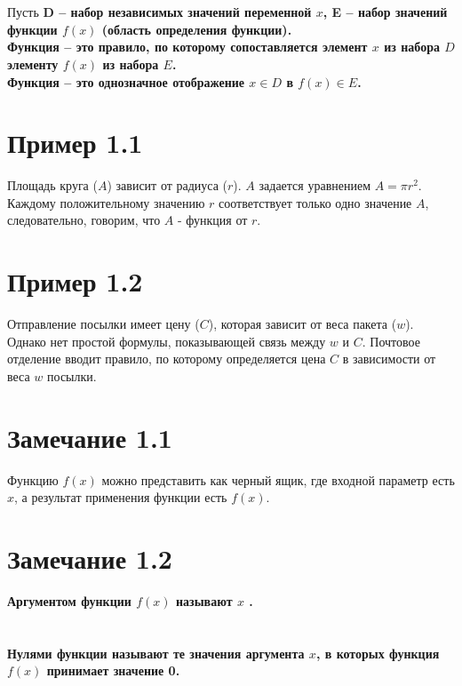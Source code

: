 \documentclass[a4paper,14pt]{report}
\begin{document}
\section*{ }
\noindent
Пусть \bf D \rm -- набор независимых значений переменной $x$, \bf{E} \rm -- набор значений функции $f(x)$ (область определения функции).\\
\bf Функция \rm -- это правило, по которому сопоставляется элемент $x$ из набора $D$ элементу $f(x)$ из набора $E$. \\
\bf Функция \rm -- это однозначное отображение $x \in D$ в $f(x) \in E$.


\section*{ Пример 1.1}
Площадь круга ($A$) зависит от радиуса ($r$). $A$ задается уравнением $A = \pi r^2$. Каждому положительному значению $r$ соответствует только одно значение $A$, следовательно, говорим, что $A$ - функция от $r$.

\section*{ Пример 1.2}
Отправление посылки имеет цену ($C$), которая зависит от веса пакета ($w$). Однако нет простой формулы, показывающей связь между $w$ и $C$. Почтовое отделение вводит правило, по которому определяется цена $C$ в зависимости от веса $w$ посылки.

\section*{ Замечание 1.1}
Функцию $f(x)$ можно представить как черный ящик, где входной параметр есть $x$, а результат применения функции есть $f(x)$. 

\section*{ Замечание 1.2}
\bf Аргументом \rm функции $f(x)$ называют $x$ .

\section*{ }
\bf Нулями \rm функции называют те значения аргумента $x$, в которых функция $f(x)$ принимает значение 0.
\end{document}
